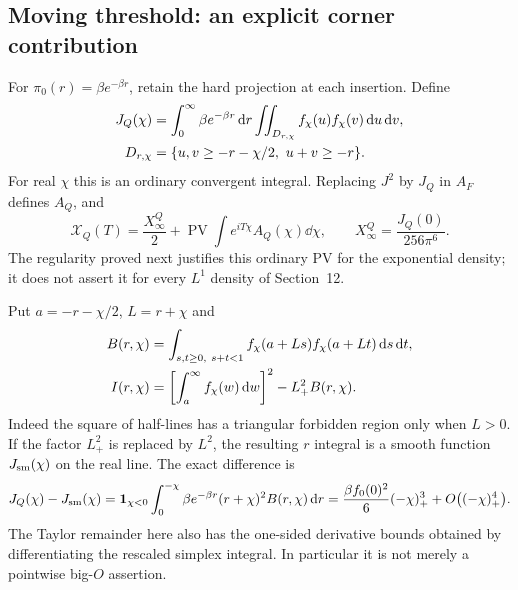 \subsection{Moving threshold: an explicit corner contribution}
For $\pi_0(r)=\beta e^{-\beta r}$, retain the hard projection at each
insertion. Define
\begin{align}
 J_Q(\chi)&=\int_0^\infty\beta e^{-\beta r}\mathop{}\!\mathrm d r
       \iint_{D_{r,\chi}}f_\chi(u)f_\chi(v)\mathop{}\!\mathrm d u\mathop{}\!\mathrm d v,\notag\\
 D_{r,\chi}&=\{u,v\ge-r-\chi/2,\ u+v\ge-r\}.
 \label{eq:prep-moving-domain}
\end{align}
For real $\chi$ this is an ordinary convergent integral. Replacing
$J^2$ by $J_Q$ in $A_F$ defines $A_Q$, and
\begin{equation}
 \mathcal X_Q(T)=\frac{X^Q_\infty}{2}
            +\operatorname{PV}\int e^{iT\chi}A_Q(\chi)\dd\chi,
 \qquad X^Q_\infty=\frac{J_Q(0)}{256\pi^6}.
 \label{eq:prep-moving-Fourier}
\end{equation}
The regularity proved next justifies this ordinary PV for the exponential
density; it does not assert it for every $L^1$ density of Section~12.

Put $a=-r-\chi/2$, $L=r+\chi$ and
\begin{align}
 B(r,\chi)&=\int_{s,t\ge0,\ s+t<1}
       f_\chi(a+Ls)f_\chi(a+Lt)\mathop{}\!\mathrm d s\mathop{}\!\mathrm d t,\notag\\
 I(r,\chi)&=\left[\int_a^\infty f_\chi(w)\mathop{}\!\mathrm d w\right]^2
                  -L_+^2 B(r,\chi).
 \label{eq:prep-triangle}
\end{align}
Indeed the square of half-lines has a triangular forbidden region only
when $L>0$. If the factor $L_+^2$ is replaced by $L^2$, the resulting
$r$ integral is a smooth function $J_{\rm sm}(\chi)$ on the real line.
The exact difference is
\begin{equation}
 J_Q(\chi)-J_{\rm sm}(\chi)
 =\mathbf 1_{\chi<0}\int_0^{-\chi}\beta e^{-\beta r}
                     (r+\chi)^2 B(r,\chi)\mathop{}\!\mathrm d r
 =\frac{\beta f_0(0)^2}{6}(-\chi)_+^3
       +O\bigl(({-\chi})_+^4\bigr).
 \label{eq:prep-corner}
\end{equation}
The Taylor remainder here also has the one-sided derivative bounds
obtained by differentiating the rescaled simplex integral. In particular
it is not merely a pointwise big-$O$ assertion.

